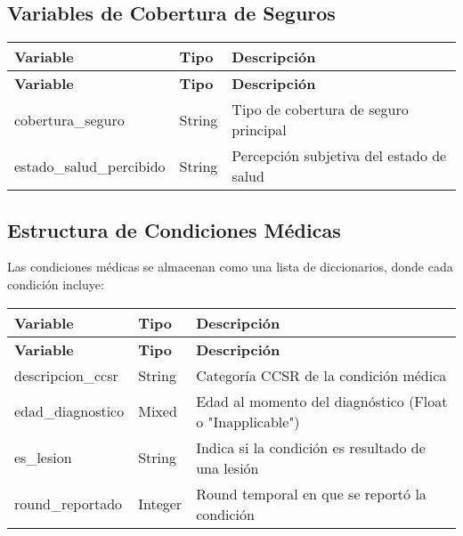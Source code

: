\documentclass[12pt,a4paper]{article}
\begin{document}
\subsection{Variables de Cobertura de Seguros}
\begin{longtable}{|p{4cm}|p{2cm}|p{8cm}|}
\hline
\textbf{Variable} & \textbf{Tipo} & \textbf{Descripción} \\
\hline
\endfirsthead
\hline
\textbf{Variable} & \textbf{Tipo} & \textbf{Descripción} \\
\hline
\endhead
cobertura\_seguro & String & Tipo de cobertura de seguro principal \\
\hline
estado\_salud\_percibido & String & Percepción subjetiva del estado de salud \\
\hline
\end{longtable}

\subsection{Estructura de Condiciones Médicas}
Las condiciones médicas se almacenan como una lista de diccionarios, donde cada condición incluye:
\begin{longtable}{|p{4cm}|p{2cm}|p{8cm}|}
\hline
\textbf{Variable} & \textbf{Tipo} & \textbf{Descripción} \\
\hline
\endfirsthead
\hline
\textbf{Variable} & \textbf{Tipo} & \textbf{Descripción} \\
\hline
\endhead
descripcion\_ccsr & String & Categoría CCSR de la condición médica \\
\hline
edad\_diagnostico & Mixed & Edad al momento del diagnóstico (Float o "Inapplicable") \\
\hline
es\_lesion & String & Indica si la condición es resultado de una lesión \\
\hline
round\_reportado & Integer & Round temporal en que se reportó la condición \\
\hline
\end{longtable}
\end{document}

